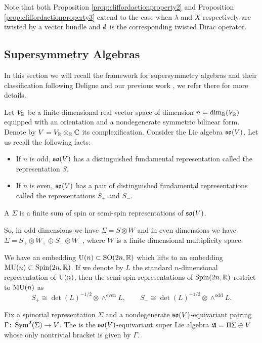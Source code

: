 \documentclass[10pt, oneside]{article}
\begin{document}
Note that both Proposition \ref{prop:cliffordactionproperty2} and Proposition \ref{prop:cliffordactionproperty3} extend to the case when $\lambda$ and $X$ respectively are twisted by a vector bundle and $\sd{\d}$ is the corresponding twisted Dirac operator.

\subsection{Supersymmetry Algebras} \label{sect:susyalgebras}
In this section we will recall the framework for supersymmetry algebras and their classification following Deligne \cite{DeligneSpinors} and our previous work \cite{ElliottSafronov}, we refer there for more details.

Let $V_\mathbb R$ be a finite-dimensional real vector space of dimension $n=\dim_\mathbb R(V_\mathbb R)$ equipped with an orientation and a nondegenerate symmetric bilinear form. Denote by $V=V_\mathbb R\otimes_\mathbb R\mathbb C$ its complexification. Consider the Lie algebra $\mathfrak{so}(V)$. Let us recall the following facts:
\begin{itemize}
\item If $n$ is odd, $\mathfrak{so}(V)$ has a distinguished fundamental representation called the  representation $S$.

\item If $n$ is even, $\mathfrak{so}(V)$ has a pair of distinguished fundamental representations called the  representations $S_+$ and $S_-$.
\end{itemize}

\begin{definition}
A  $\Sigma$ is a finite sum of spin or semi-spin representations of $\mathfrak{so}(V)$.
\end{definition}

So, in odd dimensions we have $\Sigma=S\otimes W$ and in even dimensions we have $\Sigma=S_+\otimes W_+\oplus S_-\otimes W_-$, where $W$ is a finite dimensional multiplicity space.

We have an embedding $\mathrm{U}(n)\subset \mathrm{SO}(2n, \mathbb R)$ which lifts to an embedding $\mathrm{MU}(n)\subset \mathrm{Spin}(2n, \mathbb R)$. If we denote by $L$ the standard $n$-dimensional representation of $\mathrm{U}(n)$, then the semi-spin representations of $\mathrm{Spin}(2n, \mathbb R)$ restrict to $\mathrm{MU}(n)$ as
\[S_+\cong \det(L)^{-1/2}\otimes \wedge^{\mathrm{even}} L,\qquad S_-\cong \det(L)^{-1/2}\otimes \wedge^{\mathrm{odd}} L.\]

\begin{definition}
Fix a spinorial representation $\Sigma$ and a nondegenerate $\mathfrak{so}(V)$-equivariant pairing $\Gamma\colon \operatorname{Sym}^2(\Sigma)\rightarrow V$. The  is the $\mathfrak{so}(V)$-equivariant super Lie algebra $\mathfrak A = \Pi\Sigma\oplus V$ whose only nontrivial bracket is given by $\Gamma$.
\end{definition}
\end{document}
